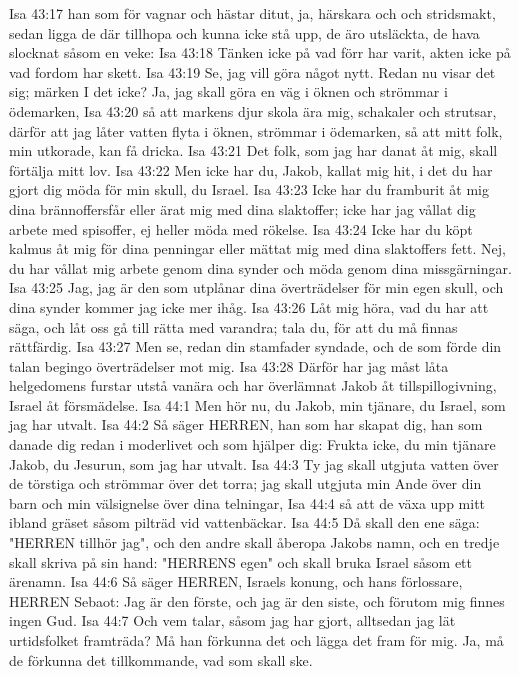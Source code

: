 Isa 43:17  han som för vagnar och hästar ditut, ja, härskara och och stridsmakt, sedan ligga de där tillhopa och kunna icke stå upp, de äro utsläckta, de hava slocknat såsom en veke:
Isa 43:18  Tänken icke på vad förr har varit, akten icke på vad fordom har skett.
Isa 43:19  Se, jag vill göra något nytt. Redan nu visar det sig; märken I det icke? Ja, jag skall göra en väg i öknen och strömmar i ödemarken,
Isa 43:20  så att markens djur skola ära mig, schakaler och strutsar, därför att jag låter vatten flyta i öknen, strömmar i ödemarken, så att mitt folk, min utkorade, kan få dricka.
Isa 43:21  Det folk, som jag har danat åt mig, skall förtälja mitt lov.
Isa 43:22  Men icke har du, Jakob, kallat mig hit, i det du har gjort dig möda för min skull, du Israel.
Isa 43:23  Icke har du framburit åt mig dina brännoffersfår eller ärat mig med dina slaktoffer; icke har jag vållat dig arbete med spisoffer, ej heller möda med rökelse.
Isa 43:24  Icke har du köpt kalmus åt mig för dina penningar eller mättat mig med dina slaktoffers fett. Nej, du har vållat mig arbete genom dina synder och möda genom dina missgärningar.
Isa 43:25  Jag, jag är den som utplånar dina överträdelser för min egen skull, och dina synder kommer jag icke mer ihåg.
Isa 43:26  Låt mig höra, vad du har att säga, och låt oss gå till rätta med varandra; tala du, för att du må finnas rättfärdig.
Isa 43:27  Men se, redan din stamfader syndade, och de som förde din talan begingo överträdelser mot mig.
Isa 43:28  Därför har jag måst låta helgedomens furstar utstå vanära och har överlämnat Jakob åt tillspillogivning, Israel åt försmädelse.
Isa 44:1  Men hör nu, du Jakob, min tjänare, du Israel, som jag har utvalt.
Isa 44:2  Så säger HERREN, han som har skapat dig, han som danade dig redan i moderlivet och som hjälper dig: Frukta icke, du min tjänare Jakob, du Jesurun, som jag har utvalt.
Isa 44:3  Ty jag skall utgjuta vatten över de törstiga och strömmar över det torra; jag skall utgjuta min Ande över din barn och min välsignelse över dina telningar,
Isa 44:4  så att de växa upp mitt ibland gräset såsom pilträd vid vattenbäckar.
Isa 44:5  Då skall den ene säga: "HERREN tillhör jag", och den andre skall åberopa Jakobs namn, och en tredje skall skriva på sin hand: "HERRENS egen" och skall bruka Israel såsom ett ärenamn.
Isa 44:6  Så säger HERREN, Israels konung, och hans förlossare, HERREN Sebaot: Jag är den förste, och jag är den siste, och förutom mig finnes ingen Gud.
Isa 44:7  Och vem talar, såsom jag har gjort, alltsedan jag lät urtidsfolket framträda? Må han förkunna det och lägga det fram för mig. Ja, må de förkunna det tillkommande, vad som skall ske.
